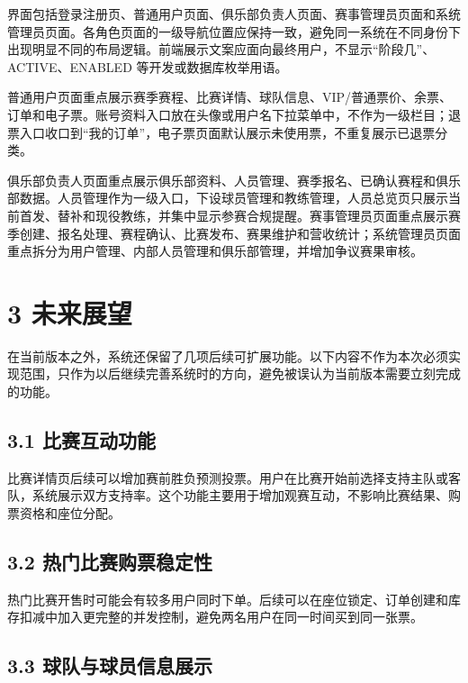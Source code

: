 \documentclass[UTF8,zihao=-4,a4paper]{ctexart}
\begin{document}
界面包括登录注册页、普通用户页面、俱乐部负责人页面、赛事管理员页面和系统管理员页面。各角色页面的一级导航位置应保持一致，避免同一系统在不同身份下出现明显不同的布局逻辑。前端展示文案应面向最终用户，不显示“阶段几”、ACTIVE、ENABLED 等开发或数据库枚举用语。

普通用户页面重点展示赛季赛程、比赛详情、球队信息、VIP/普通票价、余票、订单和电子票。账号资料入口放在头像或用户名下拉菜单中，不作为一级栏目；退票入口收口到“我的订单”，电子票页面默认展示未使用票，不重复展示已退票分类。

俱乐部负责人页面重点展示俱乐部资料、人员管理、赛季报名、已确认赛程和俱乐部数据。人员管理作为一级入口，下设球员管理和教练管理，人员总览页只展示当前首发、替补和现役教练，并集中显示参赛合规提醒。赛事管理员页面重点展示赛季创建、报名处理、赛程确认、比赛发布、赛果维护和营收统计；系统管理员页面重点拆分为用户管理、内部人员管理和俱乐部管理，并增加争议赛果审核。

\section*{3 未来展望}
{}

在当前版本之外，系统还保留了几项后续可扩展功能。以下内容不作为本次必须实现范围，只作为以后继续完善系统时的方向，避免被误认为当前版本需要立刻完成的功能。

\subsection*{3.1 比赛互动功能}
{}

比赛详情页后续可以增加赛前胜负预测投票。用户在比赛开始前选择支持主队或客队，系统展示双方支持率。这个功能主要用于增加观赛互动，不影响比赛结果、购票资格和座位分配。

\subsection*{3.2 热门比赛购票稳定性}
{}

热门比赛开售时可能会有较多用户同时下单。后续可以在座位锁定、订单创建和库存扣减中加入更完整的并发控制，避免两名用户在同一时间买到同一张票。

\subsection*{3.3 球队与球员信息展示}
{}
\end{document}
